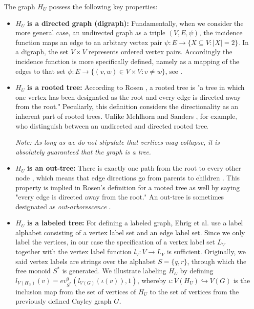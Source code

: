\begin{definition}
The graph $H_U$ possess the following key properties:
\begin{itemize}
	\item \mbox{\boldmath$H_U$} \textbf{is a directed graph (digraph):} Fundamentally, when we consider the more general case, an undirected graph as a triple $(V,E,\psi)$, the incidence function maps an edge to an arbitary vertex pair $\psi : E\rightarrow\{X\subseteq V:\left|X\right|=2\}$. In a digraph, the set $V\times V$ represents ordered vertex pairs. Accordingly the incidence function is more specifically defined, namely as a mapping of the edges to that set $\psi : E\rightarrow\{(v,w)\in V\times V:v\neq w\}$, see \cite[p.~15]{Ref_Korte_Vygen}.
	\item \mbox{\boldmath$H_U$} \textbf{is a rooted tree:} According to Rosen \cite[p.~747]{Ref_Rosen}, a rooted tree is "a tree in which one vertex has been designated as the root and every edge is directed away from the root." Peculiarly, this definition considers the directionality as an inherent part of rooted trees. Unlike Mehlhorn and Sanders \cite[p.~52]{Ref_Mehlhorn_Sanders}, for example, who distinguish between an undirected and directed rooted tree.
	\par\smallskip
	\textit{Note: As long as we do not stipulate that vertices may collapse, it is absolutely guaranteed that the graph is a tree.}
	\item \mbox{\boldmath$H_U$} \textbf{is an out-tree:} There is exactly one	path from the root to every other node \cite[p.~52]{Ref_Mehlhorn_Sanders}, which means that edge directions go from parents to children \cite[p.~108]{Ref_Du_Ko_Hu}. This property is implied in Rosen's definition for a rooted tree as well by saying "every edge is directed away from the root." An out-tree is sometimes designated as \textit{out-arborescence} \cite[p.~108]{Ref_Du_Ko_Hu}.
	\item \mbox{\boldmath$H_U$} \textbf{is a labeled tree:} For defining a labeled graph, Ehrig et al. \cite[p.~23]{Ref_Ehrig_etal} use a label alphabet consisting of a vertex label set and an edge label set. Since we only label the vertices, in our case the specification of a vertex label set $L_V$ together with the vertex label function $l_V:V\rightarrow L_V$ is sufficient. Originally, we said vertex labels are strings over the alphabet $S=\{q,r\}$, through which the free monoid $S^\ast$ is generated. We illustrate labeling $H_U$ by defining $l_{V(H_U)}(v)=ev^0_{S^\ast}(l_{V(G)}(\iota(v)),1)$, whereby $\iota:V(H_U)\hookrightarrow V(G)$ is the inclusion map \cite[p.~142]{Ref_Childs} from the set of vertices of $H_U$ to the set of vertices from the previously defined Cayley graph $G$.
\end{itemize}
\label{def:H_U}
\end{definition}

